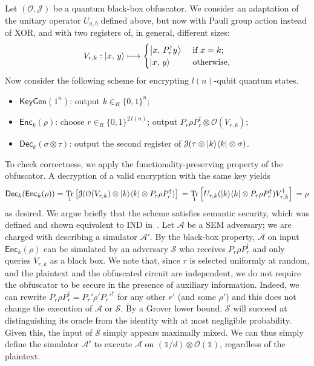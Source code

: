 \documentclass[envcountsame]{llncs}
\DeclareMathOperator{\tr}{Tr}
\numberwithin{equation}{section}
\newcommand{\one}{\mathds 1}
\newcommand{\algo}{\mathcal}
\newcommand{\KeyGen}{\ensuremath{\mathsf{KeyGen}}\xspace}
\newcommand{\Enc}{\ensuremath{\mathsf{Enc}}\xspace}
\newcommand{\Dec}{\ensuremath{\mathsf{Dec}}\xspace}
\newcommand{\inrand}{\in_R}
\begin{document}
Let $(\algo O, \algo J)$ be a quantum black-box obfuscator. We consider an adaptation of the unitary operator $U_{a, b}$ defined above, but now with Pauli group action instead of XOR, and with two registers of, in general, different sizes:
$$
V_{r, k} : {\left\vert{x,\, y}\right\rangle} \longmapsto
\begin{cases}
{\left\vert{x,\, P_r^\dagger y}\right\rangle} &\text{ if } x = k;\\
{\left\vert{x,\, y}\right\rangle} &\text{ otherwise},
\end{cases}
$$
Now consider the following scheme for encrypting $l(n)$-qubit quantum states.
\begin{itemize}
\item $\KeyGen(1^n)$: output $k \inrand \{0, 1\}^n$;
\item $\Enc_{k}(\rho)$: choose $r \inrand \{0, 1\}^{2\,l(n)}$; output $P_r \rho P_r^\dagger \otimes \algo O(V_{r, k})$;
\item $\Dec_{k}(\sigma \otimes \tau)$: output  the second register of $\algo J(\tau \otimes \ket{k}\bra{k} \otimes \sigma)$.
\end{itemize}
To check correctness, we apply the functionality-preserving property of the obfuscator. A decryption of a valid encryption with the same key yields
$$
\Dec_k (\Enc_k (\rho))  
= \tr_1 \left[\algo J(\algo O(V_{r, k}) \otimes \ket{k}\bra{k} \otimes P_r \rho P_r^\dagger)\right] \\
= \tr_1 \left[U_{r, k} (\ket{k}\bra{k} \otimes P_r \rho P_r^\dagger) V_{r, k}^\dagger\right] \\
 = \rho
$$
as desired. We argue briefly that the scheme satisfies semantic security, which was defined and shown equivalent to IND in~\cite{ABFGSS16}. Let $\algo A$ be a SEM adversary; we are charged with describing a simulator $\algo A'$. By the black-box property, $\algo A$ on input $\Enc_k(\rho)$ can be simulated by an adversary $\algo S$ who receives $P_r \rho P_r^\dagger$ and only queries $V_{r, k}$ as a black box. We note that, since $r$ is selected uniformly at random, and the plaintext and the obfuscated circuit are independent, we do not require the obfuscator to be secure in the presence of auxiliary information. Indeed, we can rewrite $P_r \rho P_r^\dagger = P_r' \rho' P_r'^\dagger$ for any other $r'$ (and some $\rho'$) and this does not change the execution of $\algo A$ or $\algo S$. By a Grover lower bound, $\algo S$ will succeed at distinguishing its oracle from the identity with at most negligible probability. Given this, the input of $\algo S$ simply appears maximally mixed. We can thus simply define the simulator $\algo A'$ to execute $\algo A$ on $(\one/d) \otimes \mathcal O(\one)$, regardless of the plaintext.
\end{document}
